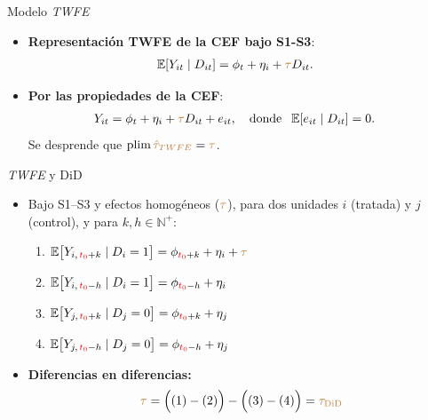 \documentclass[10pt, xcolor=dvipsnames]{beamer}
\begin{document}
\begin{frame}{Modelo \textit{TWFE}}
\begin{itemize}
    \item \textbf{Representación TWFE de la CEF bajo S1-S3}:
    \begin{align*}
    \begin{split}
        \operatorname{\mathbb{E}}[Y_{it} \mid D_{it}]  &= \phi_t + \eta_i + \textcolor{brown}{\tau} D_{it}.
    \end{split}
    \end{align*}
    \item \textbf{Por las propiedades de la CEF}:
    \begin{align*}
    \begin{split}
        Y_{it}  &= \phi_t + \eta_i + \textcolor{brown}{\tau} D_{it} + e_{it}, \quad \text{donde } \; \operatorname{\mathbb{E}}[e_{it} \mid D_{it}] = 0.
    \end{split}
    \end{align*}
    Se desprende que \(\plim \textcolor{brown}{\hat \tau_{TWFE}} = \textcolor{brown}{\tau}\).
\end{itemize}	
\end{frame}


\begin{frame}{\textit{TWFE} y DiD}
\begin{itemize}\setlength{\itemsep}{1.0em}
    \item Bajo S1–S3 y efectos homogéneos (\(\textcolor{brown}{\tau}\)), para dos unidades \(i\) (tratada) y \(j\) (control), y para \(k,h\in\mathbb{N}^{+}\):
    \vspace{0.5em}
    \begin{enumerate}\setlength{\itemsep}{0.5em}
        \item \(\operatorname{\mathbb{E}}\!\big[Y_{i,\,\textcolor{red}{t_0}+k}\mid D_i=1\big]=\phi_{\textcolor{red}{t_0}+k}+\eta_i+\textcolor{brown}{\tau}\) %
        \item \(\operatorname{\mathbb{E}}\!\big[Y_{i,\,\textcolor{red}{t_0}-h}\mid D_i=1\big]=\phi_{\textcolor{red}{t_0}-h}+\eta_i\) %
        \item \(\operatorname{\mathbb{E}}\!\big[Y_{j,\,\textcolor{red}{t_0}+k}\mid D_j=0\big]=\phi_{\textcolor{red}{t_0}+k}+\eta_j\) %
        \item \(\operatorname{\mathbb{E}}\!\big[Y_{j,\,\textcolor{red}{t_0}-h}\mid D_j=0\big]=\phi_{\textcolor{red}{t_0}-h}+\eta_j\) %
    \end{enumerate}    
    \vspace{0.9em}
    \item \textbf{Diferencias en diferencias:}
        \begin{align*}
    \textcolor{brown}{\tau} = \Big((1)-(2)\Big) - \Big((3)-(4)\Big) = \textcolor{brown}{\tau_{\text{DiD}}}
\end{align*}
\end{itemize}
\end{frame}
\end{document}
